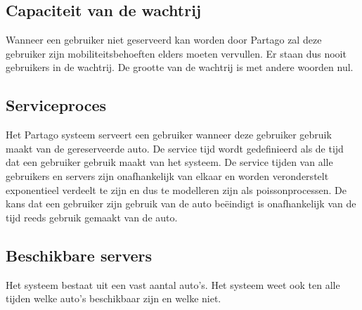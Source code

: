\subsection{Capaciteit van de wachtrij}
Wanneer een gebruiker niet geserveerd kan worden door Partago zal deze gebruiker zijn mobiliteitsbehoeften elders moeten vervullen. Er staan dus nooit gebruikers in de wachtrij. De grootte van de wachtrij is met andere woorden nul.

\subsection{Serviceproces}
Het Partago systeem serveert een gebruiker wanneer deze gebruiker gebruik maakt van de gereserveerde auto. De service tijd wordt gedefinieerd als de tijd dat een gebruiker gebruik maakt van het systeem. De service tijden van alle gebruikers en servers zijn onafhankelijk van elkaar en worden veronderstelt exponentieel verdeelt te zijn en dus te modelleren zijn als poissonprocessen. De kans dat een gebruiker zijn gebruik van de auto beëindigt is onafhankelijk van de tijd reeds gebruik gemaakt van de auto.

\subsection{Beschikbare servers}
Het systeem bestaat uit een vast aantal auto's. Het systeem weet ook ten alle tijden welke auto's beschikbaar zijn en welke niet.

